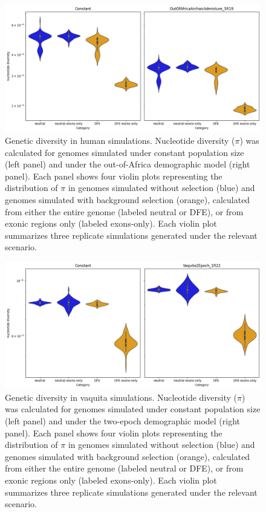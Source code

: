 \documentclass[hidelinks]{article}
\begin{document}
\begin{figure}[h]
    \centering
    \includegraphics[width=\textwidth]{figures/HomSap/summary_stats.png}
    \caption{
    \label{fig:homsap-summary-stats}
    Genetic diversity in human simulations.
    Nucleotide diversity ($\pi$) was calculated for genomes simulated
    under constant population size (left panel) and under the out-of-Africa demographic model (right panel).
    Each panel shows four violin plots representing the distribution of $\pi$
    in genomes simulated without selection (blue) and genomes simulated with background selection (orange),
    calculated from either the entire genome (labeled neutral or DFE),
    or from exonic regions only (labeled exons-only).
    Each violin plot summarizes three replicate simulations generated under the relevant scenario.
    }
\end{figure}

\begin{figure}[h]
    \centering
    \includegraphics[width=\textwidth]{figures/PhoSin/summary_stats.png}
    \caption{
    \label{fig:vaquita-summary-stats}
    Genetic diversity in vaquita simulations.
    Nucleotide diversity ($\pi$) was calculated for genomes simulated
    under constant population size (left panel) and under the two-epoch demographic model (right panel).
    Each panel shows four violin plots representing the distribution of $\pi$
    in genomes simulated without selection (blue) and genomes simulated with background selection (orange),
    calculated from either the entire genome (labeled neutral or DFE),
    or from exonic regions only (labeled exons-only).
    Each violin plot summarizes three replicate simulations generated under the relevant scenario.
     }
\end{figure}
\end{document}
